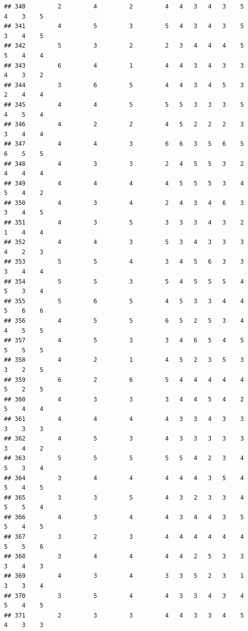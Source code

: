 \documentclass[
]{article}
\begin{document}
\begin{verbatim}
## 340         2         4         2         4   4   3   4   3    5    4    3    5
## 341         4         5         3         5   4   3   4   3    5    3    4    5
## 342         5         3         2         2   3   4   4   4    5    5    4    4
## 343         6         4         1         4   4   3   4   3    3    4    3    2
## 344         3         6         5         4   4   3   4   5    3    2    4    4
## 345         4         4         5         5   5   3   3   3    5    4    5    4
## 346         4         2         2         4   5   2   2   2    3    3    4    4
## 347         4         4         3         6   6   3   5   6    5    6    5    5
## 348         4         3         3         2   4   5   5   3    2    4    4    4
## 349         4         4         4         4   5   5   5   3    4    5    4    2
## 350         4         3         4         2   4   3   4   6    3    3    4    5
## 351         4         3         5         3   3   3   4   3    2    1    4    4
## 352         4         4         3         5   3   4   3   3    3    4    2    3
## 353         5         5         4         3   4   5   6   3    3    3    4    4
## 354         5         5         3         5   4   5   5   5    4    5    3    4
## 355         5         6         5         4   5   3   3   4    4    5    6    6
## 356         4         5         5         6   5   2   5   3    4    4    5    5
## 357         4         5         3         3   4   6   5   4    5    5    5    5
## 358         4         2         1         4   5   2   3   5    3    3    2    5
## 359         6         2         6         5   4   4   4   4    4    5    2    5
## 360         4         3         3         3   4   4   5   4    2    5    4    4
## 361         4         4         4         4   3   3   4   3    3    3    3    3
## 362         4         5         3         4   3   3   3   3    3    3    4    2
## 363         5         5         5         5   5   4   2   3    4    5    3    4
## 364         3         4         4         4   4   4   3   5    4    5    4    5
## 365         3         3         5         4   3   2   3   3    4    5    5    4
## 366         4         3         4         4   3   4   4   3    5    5    4    5
## 367         3         2         3         4   4   4   4   4    4    5    5    6
## 368         3         4         4         4   4   2   5   3    3    3    4    3
## 369         4         3         4         3   3   5   2   3    1    3    3    4
## 370         3         5         4         4   3   3   4   3    4    5    4    5
## 371         2         3         3         4   4   3   3   4    5    4    3    3

\end{verbatim}
\end{document}
